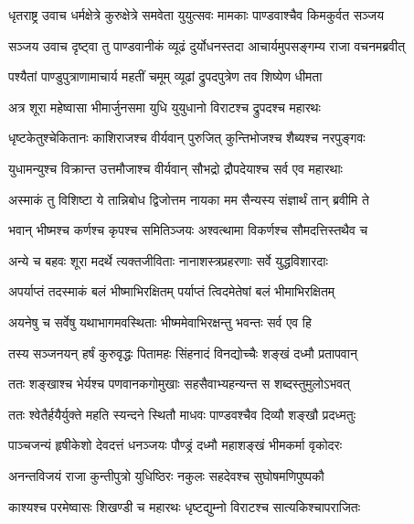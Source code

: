 {धृतराष्ट्र उवाच}
\twolineshloka
{धर्मक्षेत्रे कुरुक्षेत्रे समवेता युयुत्सवः}
{मामकाः पाण्डवाश्चैव किमकुर्वत सञ्जय}%

{सञ्जय उवाच}
\twolineshloka
{दृष्ट्वा तु पाण्डवानीकं व्यूढं दुर्योधनस्तदा}
{आचार्यमुपसङ्गम्य राजा वचनमब्रवीत्}%

\twolineshloka
{पश्यैतां पाण्डुपुत्राणामाचार्य महतीं चमूम्}
{व्यूढां द्रुपदपुत्रेण तव शिष्येण धीमता}%

\twolineshloka
{अत्र शूरा महेष्वासा भीमार्जुनसमा युधि}
{युयुधानो विराटश्च द्रुपदश्च महारथः}%

\twolineshloka
{धृष्टकेतुश्चेकितानः काशिराजश्च वीर्यवान्}
{पुरुजित् कुन्तिभोजश्च शैब्यश्च नरपुङ्गवः}%

\twolineshloka
{युधामन्युश्च विक्रान्त उत्तमौजाश्च वीर्यवान्}
{सौभद्रो द्रौपदेयाश्च सर्व एव महारथाः}%

\twolineshloka
{अस्माकं तु विशिष्टा ये तान्निबोध द्विजोत्तम}
{नायका मम सैन्यस्य संज्ञार्थं तान् ब्रवीमि ते}%

\twolineshloka
{भवान् भीष्मश्च कर्णश्च कृपश्च समितिञ्जयः}
{अश्वत्थामा विकर्णश्च सौमदत्तिस्तथैव च}%

\twolineshloka
{अन्ये च बहवः शूरा मदर्थे त्यक्तजीविताः}
{नानाशस्त्रप्रहरणाः सर्वे युद्धविशारदाः}%

\twolineshloka
{अपर्याप्तं तदस्माकं बलं भीष्माभिरक्षितम्}
{पर्याप्तं त्विदमेतेषां बलं भीमाभिरक्षितम्}%

\twolineshloka
{अयनेषु च सर्वेषु यथाभागमवस्थिताः}
{भीष्ममेवाभिरक्षन्तु भवन्तः सर्व एव हि}%

\twolineshloka
{तस्य सञ्जनयन् हर्षं कुरुवृद्धः पितामहः}
{सिंहनादं विनद्योच्चैः शङ्खं दध्मौ प्रतापवान्}%

\twolineshloka
{ततः शङ्खाश्च भेर्यश्च पणवानकगोमुखाः}
{सहसैवाभ्यहन्यन्त स शब्दस्तुमुलोऽभवत्}%

\twolineshloka
{ततः श्वेतैर्हयैर्युक्ते महति स्यन्दने स्थितौ}
{माधवः पाण्डवश्चैव दिव्यौ शङ्खौ प्रदध्मतुः}%

\twolineshloka
{पाञ्चजन्यं हृषीकेशो देवदत्तं धनञ्जयः}
{पौण्ड्रं दध्मौ महाशङ्खं भीमकर्मा वृकोदरः}%

\twolineshloka
{अनन्तविजयं राजा कुन्तीपुत्रो युधिष्ठिरः}
{नकुलः सहदेवश्च सुघोषमणिपुष्पकौ}%

\twolineshloka
{काश्यश्च परमेष्वासः शिखण्डी च महारथः}
{धृष्टद्युम्नो विराटश्च सात्यकिश्चापराजितः}%

